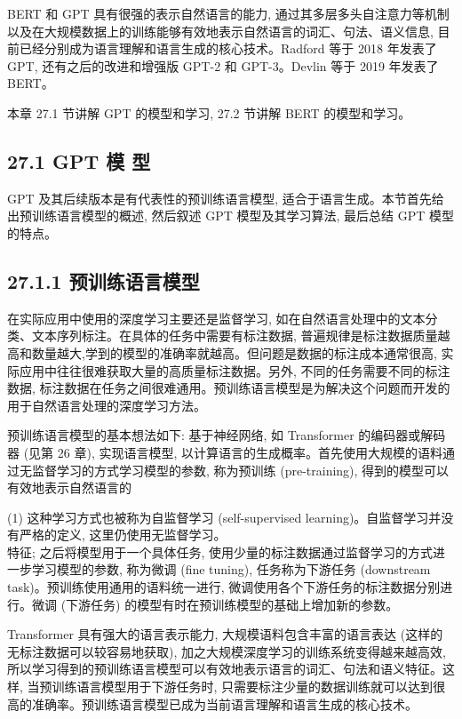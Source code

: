 \documentclass[10pt]{article}
\begin{document}
BERT 和 GPT 具有很强的表示自然语言的能力, 通过其多层多头自注意力等机制以及在大规模数据上的训练能够有效地表示自然语言的词汇、句法、语义信息, 目前已经分别成为语言理解和语言生成的核心技术。Radford 等于 2018 年发表了 GPT, 还有之后的改进和增强版 GPT-2 和 GPT-3。Devlin 等于 2019 年发表了 BERT。

本章 27.1 节讲解 GPT 的模型和学习, 27.2 节讲解 BERT 的模型和学习。

\subsection*{27.1 GPT 模 型}
GPT 及其后续版本是有代表性的预训练语言模型, 适合于语言生成。本节首先给出预训练语言模型的概述, 然后叙述 GPT 模型及其学习算法, 最后总结 GPT 模型的特点。

\subsection*{27.1.1 预训练语言模型}
在实际应用中使用的深度学习主要还是监督学习, 如在自然语言处理中的文本分类、文本序列标注。在具体的任务中需要有标注数据, 普遍规律是标注数据质量越高和数量越大,学到的模型的准确率就越高。但问题是数据的标注成本通常很高, 实际应用中往往很难获取大量的高质量标注数据。另外, 不同的任务需要不同的标注数据, 标注数据在任务之间很难通用。预训练语言模型是为解决这个问题而开发的用于自然语言处理的深度学习方法。

预训练语言模型的基本想法如下: 基于神经网络, 如 Transformer 的编码器或解码器 (见第 26 章), 实现语言模型, 以计算语言的生成概率。首先使用大规模的语料通过无监督学习的方式学习模型的参数, 称为预训练 (pre-training), 得到的模型可以有效地表示自然语言的

(1) 这种学习方式也被称为自监督学习 (self-supervised learning)。自监督学习并没有严格的定义, 这里仍使用无监督学习。\\
特征; 之后将模型用于一个具体任务, 使用少量的标注数据通过监督学习的方式进一步学习模型的参数, 称为微调 (fine tuning), 任务称为下游任务 (downstream task)。预训练使用通用的语料统一进行, 微调使用各个下游任务的标注数据分别进行。微调 (下游任务) 的模型有时在预训练模型的基础上增加新的参数。

Transformer 具有强大的语言表示能力, 大规模语料包含丰富的语言表达 (这样的无标注数据可以较容易地获取), 加之大规模深度学习的训练系统变得越来越高效, 所以学习得到的预训练语言模型可以有效地表示语言的词汇、句法和语义特征。这样, 当预训练语言模型用于下游任务时, 只需要标注少量的数据训练就可以达到很高的准确率。预训练语言模型已成为当前语言理解和语言生成的核心技术。
\end{document}
